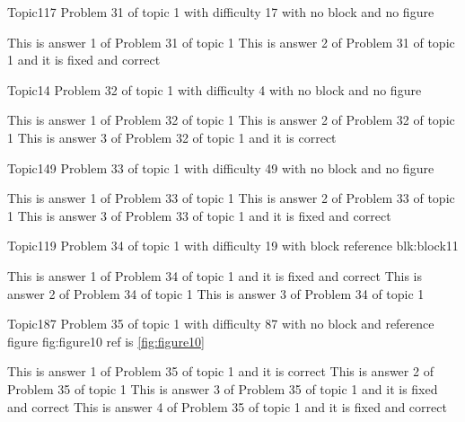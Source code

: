 \documentclass[master]{exam}
\begin{document}
\begin{problem}{Topic1}{17}
	Problem 31 of topic 1 with difficulty 17 with no block and no figure
	\begin{answers}
		\answer This is answer 1 of Problem 31 of topic 1 
		 This is answer 2 of Problem 31 of topic 1 and it is fixed and correct
	\end{answers}
\end{problem}

\begin{problem}{Topic1}{4}
	Problem 32 of topic 1 with difficulty 4 with no block and no figure
	\begin{answers}
		\answer This is answer 1 of Problem 32 of topic 1 
		\answer This is answer 2 of Problem 32 of topic 1 
		\answer[correct] This is answer 3 of Problem 32 of topic 1 and it is correct
	\end{answers}
\end{problem}

\begin{problem}{Topic1}{49}
	Problem 33 of topic 1 with difficulty 49 with no block and no figure
	\begin{answers}
		\answer This is answer 1 of Problem 33 of topic 1 
		\answer This is answer 2 of Problem 33 of topic 1 
		 This is answer 3 of Problem 33 of topic 1 and it is fixed and correct
	\end{answers}
\end{problem}

\begin{problem}[requires=blk:block11]{Topic1}{19}
	Problem 34 of topic 1 with difficulty 19 with block reference blk:block11
	\begin{answers}
		 This is answer 1 of Problem 34 of topic 1 and it is fixed and correct
		\answer This is answer 2 of Problem 34 of topic 1 
		\answer This is answer 3 of Problem 34 of topic 1 
	\end{answers}
\end{problem}

\begin{problem}{Topic1}{87}
	Problem 35 of topic 1 with difficulty 87 with no block and reference figure fig:figure10 ref is \ref{fig:figure10}
	\begin{answers}
		\answer[correct] This is answer 1 of Problem 35 of topic 1 and it is correct
		\answer This is answer 2 of Problem 35 of topic 1 
		 This is answer 3 of Problem 35 of topic 1 and it is fixed and correct
		 This is answer 4 of Problem 35 of topic 1 and it is fixed and correct
	\end{answers}
\end{problem}
\end{document}
